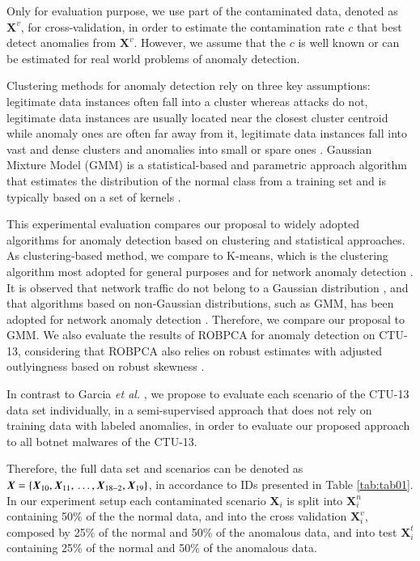 \documentclass[review]{elsarticle}
\begin{document}
Only for evaluation purpose, we use part of the contaminated data, denoted as $\textbf{X}^v$, for cross-validation, in order to estimate the contamination rate $c$ that best detect anomalies from $\textbf{X}^v$. However, we assume that the $c$ is well known or can be estimated for real world problems of anomaly detection.

Clustering methods for anomaly detection rely on three key assumptions: legitimate data instances often fall into a cluster whereas attacks do not, legitimate data instances are usually located near the closest cluster centroid while anomaly ones are often far away from it, legitimate data instances fall into vast and dense clusters and anomalies into small or spare ones \cite{ahmed2016survey, moustafa2019holistic}. Gaussian Mixture Model (GMM) is a statistical-based and parametric approach algorithm that estimates the distribution of the normal class from a training set and is typically based on a set of kernels \cite{moustafa2019holistic}.

This experimental evaluation compares our proposal to widely adopted algorithms for anomaly detection based on clustering and statistical approaches. As clustering-based method, we compare to K-means, which is the clustering algorithm most adopted for general purposes and for network anomaly detection \cite{gaddam2007kmeans,moustafa2019holistic}. It is observed that network traffic do not belong to a Gaussian distribution \cite{benson2010network,moustafa2019holistic}, and that algorithms based on non-Gaussian distributions, such as GMM, has been adopted for network anomaly detection \cite{moustafa2019holistic}. Therefore, we compare our proposal to GMM. We also evaluate the results of ROBPCA for anomaly detection on CTU-13, considering that ROBPCA also relies on robust estimates with adjusted outlyingness based on robust skewness \cite{hubert2009robustskewed}. 

In contrast to Garcia \emph{et al.} \cite{garcia2014empirical}, we propose to evaluate each scenario of the CTU-13 data set individually, in a semi-supervised approach that does not rely on training data with labeled anomalies, in order to evaluate our proposed approach to all botnet malwares of the CTU-13. 

Therefore, the full data set and scenarios can be denoted as $\boldsymbol{X} = \{\boldsymbol{X}_{10}, \boldsymbol{X}_{11}, \\\ldots , \boldsymbol{X}_{18-2}, \boldsymbol{X}_{19}\}$, in accordance to IDs presented in Table \ref{tab:tab01}. In our experiment setup each contaminated scenario $\boldsymbol{X}_i$ is split into $\boldsymbol{X}_i^n$ containing 50\% of the the normal data, and into the cross validation $\boldsymbol{X}_i^v$, composed by 25\% of the normal and 50\% of the anomalous data, and into test $\boldsymbol{X}_i^t$ containing 25\% of the normal and 50\% of the anomalous data. 
\end{document}
